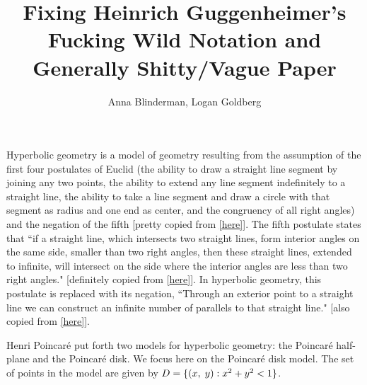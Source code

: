 \documentclass[12pt]{article}
\title{Fixing Heinrich Guggenheimer's Fucking Wild Notation and Generally Shitty/Vague Paper}
\author{Anna Blinderman, Logan Goldberg}
\date{}
\newcommand{\poincare}{Poincar\'{e} }
\newcommand{\ttc}{, \hspace{1mm}}
\begin{document}
\maketitle


Hyperbolic geometry is a model of geometry resulting from the assumption of the first four postulates of Euclid (the ability to draw a straight line segment by joining any two points, the ability to extend any line segment indefinitely to a straight line, the ability to take a line segment and draw a circle with that segment as radius and one end as center, and the congruency of all right angles) and the negation of the fifth [pretty copied from \href{http://mathworld.wolfram.com/EuclidsPostulates.html}{[here]}]. The fifth postulate states that ``if a straight line, which intersects two straight lines, form interior angles on the same side, smaller than two right angles, then these straight lines, extended to infinite, will intersect on the side where the interior angles are less than two right angles." [definitely copied from [\href{https://pdfs.semanticscholar.org/ed0e/d1fee9bbe60b24be373ac1207d17ecb90b4a.pdf}{here}]]. In hyperbolic geometry, this postulate is replaced with its negation, ``Through an exterior point to a straight line we can construct an infinite number of parallels to that straight line." [also copied from \href{https://pdfs.semanticscholar.org/ed0e/d1fee9bbe60b24be373ac1207d17ecb90b4a.pdf}{[here]}]. 
	
Henri \poincare put forth two models for hyperbolic geometry: the \poincare half-plane and the \poincare disk. We focus here on the \poincare disk model. The set of points in the model are given by $D = \{(x\ttc y): x^2 + y^2 < 1\}$. %
	
\end{document}
